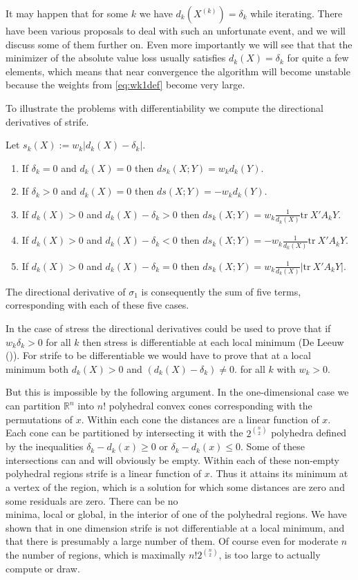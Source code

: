 \documentclass[
  12pt,
  letterpaper,
  DIV=11,
  numbers=noendperiod]{scrartcl}
\providecommand{\tightlist}{%
  \setlength{\itemsep}{0pt}\setlength{\parskip}{0pt}}\usepackage{longtable,booktabs,array}
\begin{document}
It may happen that for some \(k\) we have \(d_k(X^{(k)})=\delta_k\)
while iterating. There have been various proposals to deal with such an
unfortunate event, and we will discuss some of them further on. Even
more importantly we will see that that the minimizer of the absolute
value loss usually satisfies \(d_k(X)=\delta_k\) for quite a few
elements, which means that near convergence the algorithm will become
unstable because the weights from \eqref{eq:wk1def} become very large.

To illustrate the problems with differentiability we compute the
directional derivatives of strife.

Let \(s_k(X):=w_k|d_k(X)-\delta_k|\).

\begin{enumerate}
\def\labelenumi{\arabic{enumi}.}
\tightlist
\item
  If \(\delta_k=0\) and \(d_k(X)=0\) then \(ds_k(X;Y)=w_kd_k(Y)\).
\item
  If \(\delta_k>0\) and \(d_k(X)=0\) then \(ds(X;Y)=-w_kd_k(Y)\).
\item
  If \(d_k(X)>0\) and \(d_k(X)-\delta_k>0\) then
  \(ds_k(X;Y)=w_k\frac{1}{d_k(X)}\text{tr}\ X'A_kY\).
\item
  If \(d_k(X)>0\) and \(d_k(X)-\delta_k<0\) then
  \(ds_k(X;Y)=-w_k\frac{1}{d_k(X)}\text{tr}\ X'A_kY\).
\item
  If \(d_k(X)>0\) and \(d_k(X)-\delta_k=0\) then
  \(ds_k(X;Y)=w_k\frac{1}{d_k(X)}|\text{tr}\ X'A_kY|\).
\end{enumerate}

The directional derivative of \(\sigma_1\) is consequently the sum of
five terms, corresponding with each of these five cases.

In the case of stress the directional derivatives could be used to prove
that if \(w_k\delta_k>0\) for all \(k\) then stress is differentiable at
each local minimum (De Leeuw ()). For
strife to be differentiable we would have to prove that at a local
minimum both \(d_k(X)>0\) and \((d_k(X)-\delta_k)\not= 0\). for all
\(k\) with \(w_k>0\).

But this is impossible by the following argument. In the one-dimensional
case we can partition \(\mathbb{R}^n\) into \(n!\) polyhedral convex
cones corresponding with the permutations of \(x\). Within each cone the
distances are a linear function of \(x\). Each cone can be partitioned
by intersecting it with the \(2^\binom{n}{2}\) polyhedra defined by the
inequalities \(\delta_k-d_k(x)\geq 0\) or \(\delta_k-d_k(x)\leq 0\).
Some of these intersections can and will obviously be empty. Within each
of these non-empty polyhedral regions strife is a linear function of
\(x\). Thus it attains its minimum at a vertex of the region, which is a
solution for which some distances are zero and some residuals are zero.
There can be no\\
minima, local or global, in the interior of one of the polyhedral
regions. We have shown that in one dimension strife is not
differentiable at a local minimum, and that there is presumably a large
number of them. Of course even for moderate \(n\) the number of regions,
which is maximally \(n!2^\binom{n}{2}\), is too large to actually
compute or draw.
\end{document}
